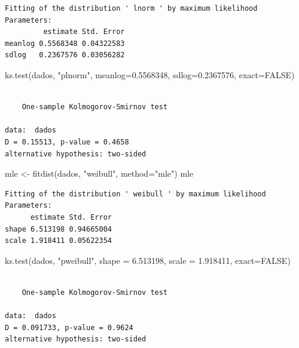 \documentclass[
  letterpaper,
  DIV=11,
  numbers=noendperiod]{scrartcl}
\newenvironment{Shaded}{\begin{snugshade}}{\end{snugshade}}
\newcommand{\AttributeTok}[1]{\textcolor[rgb]{0.40,0.45,0.13}{#1}}
\newcommand{\ConstantTok}[1]{\textcolor[rgb]{0.56,0.35,0.01}{#1}}
\newcommand{\FloatTok}[1]{\textcolor[rgb]{0.68,0.00,0.00}{#1}}
\newcommand{\FunctionTok}[1]{\textcolor[rgb]{0.28,0.35,0.67}{#1}}
\newcommand{\NormalTok}[1]{\textcolor[rgb]{0.00,0.23,0.31}{#1}}
\newcommand{\OtherTok}[1]{\textcolor[rgb]{0.00,0.23,0.31}{#1}}
\newcommand{\StringTok}[1]{\textcolor[rgb]{0.13,0.47,0.30}{#1}}
\begin{document}
\begin{verbatim}
Fitting of the distribution ' lnorm ' by maximum likelihood 
Parameters:
         estimate Std. Error
meanlog 0.5568348 0.04322583
sdlog   0.2367576 0.03056282
\end{verbatim}

\begin{Shaded}
\begin{Highlighting}[]
\FunctionTok{ks.test}\NormalTok{(dados, }\StringTok{"plnorm"}\NormalTok{, }\AttributeTok{meanlog=}\FloatTok{0.5568348}\NormalTok{, }\AttributeTok{sdlog=}\FloatTok{0.2367576}\NormalTok{, }\AttributeTok{exact=}\ConstantTok{FALSE}\NormalTok{)}
\end{Highlighting}
\end{Shaded}

\begin{verbatim}

    One-sample Kolmogorov-Smirnov test

data:  dados
D = 0.15513, p-value = 0.4658
alternative hypothesis: two-sided
\end{verbatim}

\begin{Shaded}
\begin{Highlighting}[]
\NormalTok{mle }\OtherTok{\textless{}{-}} \FunctionTok{fitdist}\NormalTok{(dados, }\StringTok{"weibull"}\NormalTok{, }\AttributeTok{method=}\StringTok{"mle"}\NormalTok{)}
\NormalTok{mle}
\end{Highlighting}
\end{Shaded}

\begin{verbatim}
Fitting of the distribution ' weibull ' by maximum likelihood 
Parameters:
      estimate Std. Error
shape 6.513198 0.94665004
scale 1.918411 0.05622354
\end{verbatim}

\begin{Shaded}
\begin{Highlighting}[]
\FunctionTok{ks.test}\NormalTok{(dados, }\StringTok{"pweibull"}\NormalTok{, }\AttributeTok{shape =} \FloatTok{6.513198}\NormalTok{, }\AttributeTok{scale =} \FloatTok{1.918411}\NormalTok{, }\AttributeTok{exact=}\ConstantTok{FALSE}\NormalTok{)}
\end{Highlighting}
\end{Shaded}

\begin{verbatim}

    One-sample Kolmogorov-Smirnov test

data:  dados
D = 0.091733, p-value = 0.9624
alternative hypothesis: two-sided
\end{verbatim}
\end{document}
